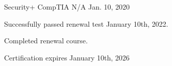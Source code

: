 

\begin{cventries}

	\cventry
	{Security+}
	{CompTIA}
	{N/A}
	{Jan. 10, 2020}
	{
		\begin{cvitems} %
			\item {Successfully passed renewal test January 10th, 2022.}
			\item {Completed renewal course.}
			\item {Certification expires January 10th, 2026}
		\end{cvitems}
	}

\end{cventries}
